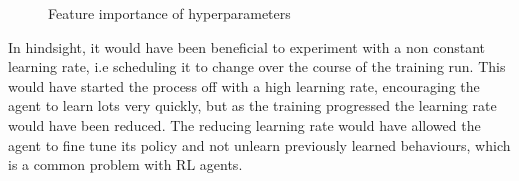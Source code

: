 \begin{figure}[!htb]
    \centering
    \caption{Feature importance of hyperparameters}\label{feature_importance}
\end{figure}


In hindsight, it would have been beneficial to experiment with a non constant learning rate, i.e scheduling it to change over the course of the training run. This would have started the process off with a high learning rate, encouraging the agent to learn lots very quickly, but as the training progressed the learning rate would have been reduced. The reducing learning rate would have allowed the agent to fine tune its policy and not unlearn previously learned behaviours, which is a common problem with RL agents.

